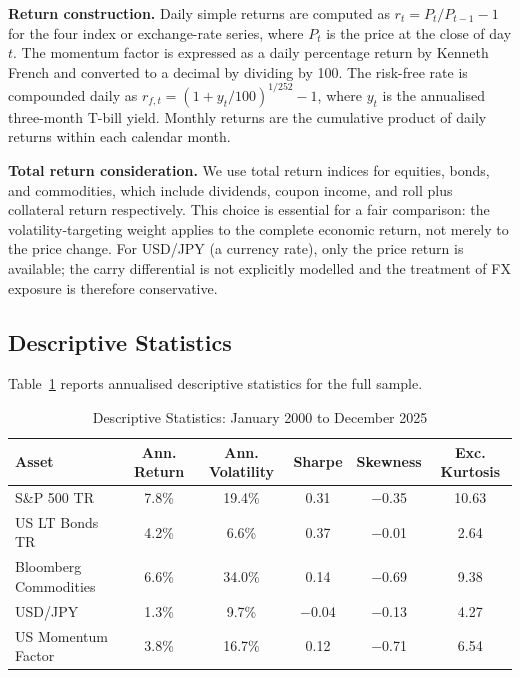 \documentclass[12pt, a4paper]{article}
\begin{document}
\noindent\textbf{Return construction.}
Daily simple returns are computed as $r_t = P_t/P_{t-1} - 1$ for the four index or
exchange-rate series, where $P_t$ is the price at the close of day $t$. The momentum
factor is expressed as a daily percentage return by Kenneth French and converted to a
decimal by dividing by 100. The risk-free rate is compounded daily as
$r_{f,t} = (1 + y_t/100)^{1/252} - 1$, where $y_t$ is the annualised three-month T-bill
yield. Monthly returns are the cumulative product of daily returns within each calendar
month.

\noindent\textbf{Total return consideration.}
We use total return indices for equities, bonds, and commodities, which include
dividends, coupon income, and roll plus collateral return respectively. This choice is
essential for a fair comparison: the volatility-targeting weight applies to the complete
economic return, not merely to the price change. For USD/JPY (a currency rate), only the
price return is available; the carry differential is not explicitly modelled and the
treatment of FX exposure is therefore conservative.

\subsection{Descriptive Statistics}

Table~\ref{tab:desc_stats} reports annualised descriptive statistics for the full sample.

\begin{table}[H]
  \centering
  \caption{Descriptive Statistics: January 2000 to December 2025}
  \label{tab:desc_stats}
  \small
  \begin{tabular}{lccccc}
    \toprule
    \textbf{Asset} & \textbf{Ann. Return} & \textbf{Ann. Volatility} & \textbf{Sharpe}
                   & \textbf{Skewness} & \textbf{Exc. Kurtosis} \\
    \midrule
    S\&P 500 TR              & 7.8\%  & 19.4\% &  0.31 & $-$0.35 & 10.63 \\
    US LT Bonds TR           & 4.2\%  &  6.6\% &  0.37 & $-$0.01 &  2.64 \\
    Bloomberg Commodities    & 6.6\%  & 34.0\% &  0.14 & $-$0.69 &  9.38 \\
    USD/JPY                  & 1.3\%  &  9.7\% & $-$0.04 & $-$0.13 & 4.27 \\
    US Momentum Factor       & 3.8\%  & 16.7\% &  0.12 & $-$0.71 &  6.54 \\
    \bottomrule
  \end{tabular}
\end{table}
\end{document}
